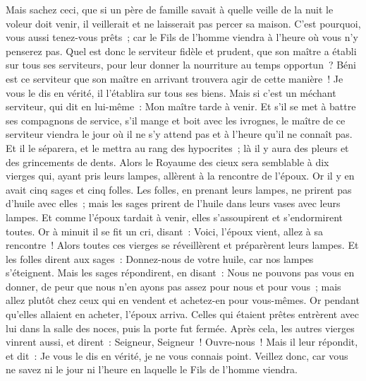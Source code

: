 \begin{multicols}{2}
Mais sachez ceci, que si un père de famille savait à quelle veille de la nuit le voleur doit venir, il veillerait et ne laisserait pas percer sa maison.
C'est pourquoi, vous aussi tenez-vous prêts~; car le Fils de l'homme viendra à l'heure où vous n'y penserez pas.
Quel est donc le serviteur fidèle et prudent, que son maître a établi sur tous ses serviteurs, pour leur donner la nourriture au temps opportun~?
Béni est ce serviteur que son maître en arrivant trouvera agir de cette manière~!
Je vous le dis en vérité, il l'établira sur tous ses biens.
Mais si c'est un méchant serviteur, qui dit en lui-même~: Mon maître tarde à venir.
Et s'il se met à battre ses compagnons de service, s'il mange et boit avec les ivrognes,
le maître de ce serviteur viendra le jour où il ne s'y attend pas et à l'heure qu'il ne connaît pas.
Et il le séparera, et le mettra au rang des hypocrites~; là il y aura des pleurs et des grincements de dents.
\VerseOne{}Alors le Royaume des cieux sera semblable à dix vierges qui, ayant pris leurs lampes, allèrent à la rencontre de l'époux.
Or il y en avait cinq sages et cinq folles.
Les folles, en prenant leurs lampes, ne prirent pas d'huile avec elles~;
mais les sages prirent de l'huile dans leurs vases avec leurs lampes.
Et comme l'époux tardait à venir, elles s'assoupirent et s'endormirent toutes.
Or à minuit il se fit un cri, disant~: Voici, l'époux vient, allez à sa rencontre~!
Alors toutes ces vierges se réveillèrent et préparèrent leurs lampes.
Et les folles dirent aux sages~: Donnez-nous de votre huile, car nos lampes s'éteignent.
Mais les sages répondirent, en disant~: Nous ne pouvons pas vous en donner, de peur que nous n'en ayons pas assez pour nous et pour vous~; mais allez plutôt chez ceux qui en vendent et achetez-en pour vous-mêmes.
Or pendant qu'elles allaient en acheter, l'époux arriva. Celles qui étaient prêtes entrèrent avec lui dans la salle des noces, puis la porte fut fermée.
Après cela, les autres vierges vinrent aussi, et dirent~: Seigneur, Seigneur~! Ouvre-nous~!
Mais il leur répondit, et dit~: Je vous le dis en vérité, je ne vous connais point.
Veillez donc, car vous ne savez ni le jour ni l'heure en laquelle le Fils de l'homme viendra.

\end{multicols}
